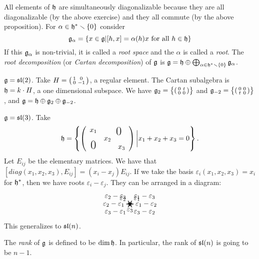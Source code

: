  All elements of $\h$ are simultaneously diagonalizable because they are all
 diagonalizable (by the above exercise) and they all commute (by the above
 proposition). For $\alpha\in\h^*\smallsetminus \{0\}$ consider
 \[
    \g_\alpha = \{x\in \g| [h,x]=\alpha(h)x \text{ for all } h\in \h\}
 \]
 If this $\g_\alpha$ is non-trivial, it is called a \emph{root space} and the $\alpha$ is called a \emph{root}. The \emph{root
 decomposition} (or \emph{Cartan
 decomposition}) of $\g$ is $\g = \h \oplus
 \bigoplus_{\alpha\in \h^*\smallsetminus \{0\}} \g_\alpha$.
 \begin{example} 
   $\g=\sl(2)$. Take $H=\matrix{1}{0}{0}{-1}$, a regular element. The Cartan
   subalgebra is $\h=k\cdot H$, a one dimensional subspace. We have $\g_2 =
   \bigl\{\matrix{0}{t}{0}{0}\bigr\}$ and $\g_{-2} =
   \bigl\{\matrix{0}{0}{t}{0}\bigr\}$, and $\g=\h\oplus \g_2\oplus \g_{-2}$.
 \end{example}
 \begin{example}\label{lec13Eg:sl3}
   $\g=\sl(3)$. Take
   \[
    \h = \left\{ \mat{x_1 & & \llap{\smash{\raisebox{-1ex}{\mbox{\LARGE $0$}}}}\\
        & x_2\\ \smash{\mbox{\LARGE $0$}} & & x_3}\bigg| x_1+x_2+x_3=0\right\}.
   \]
   Let $E_{ij}$ be the elementary matrices. We have that
   $[diag(x_1,x_2,x_3),E_{ij}]=(x_i-x_j)E_{ij}$. If we take the basis
   $\varepsilon_i(x_1,x_2,x_3)=x_i$ for $\h^*$, then we have roots $\varepsilon_i -
   \varepsilon_j$. They can be arranged in a diagram:
  \[\begin{xy}
  (0,0)="c",
  \ar@{.>} a(30)   ="1" *+!LD{\varepsilon_1},
  \ar@{.>} a(150)  ="2" *+!RD{\varepsilon_2},
  \ar@{.>} a(-90)  ="3" *+!U{\varepsilon_3},
  \ar@{->} "1"-"2" *+!L{\varepsilon_1 - \varepsilon_2},
  \ar@{->} "1"-"3" *+!DL{\varepsilon_1 - \varepsilon_3},
  \ar@{->} "2"-"1" *+!R{\varepsilon_2 - \varepsilon_1},
  \ar@{->} "2"-"3" *+!DR{\varepsilon_2 - \varepsilon_3},
  \ar@{->} "3"-"1" *+!UR{\varepsilon_3 - \varepsilon_1},
  \ar@{->} "3"-"2" *+!UL{\varepsilon_3 - \varepsilon_2},
 \end{xy}\]
   This generalizes to $\sl(n)$.
 \end{example}
 The \emph{rank} of $\g$ is defined to be $\dim \h$. In particular, the
 rank of $\sl(n)$ is going to be $n-1$.

